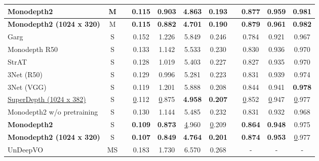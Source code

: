 \begin{table}[h]
{\begin{tabular}{lcccccccccc}
			\textbf{Monodepth2 \cite{godard2019digging}} &
			M &
			&
			\textbf{0.115} &
			\textbf{0.903} &
			\textbf{4.863} &
			\textbf{0.193} &
			\textbf{} &
			\textbf{0.877} &
			\textbf{0.959} &
			\textbf{0.981} \\ \hline
			\textbf{Monodepth2 (1024 x 320) \cite{godard2019digging}} &
			M &
			&
			\textbf{0.115} &
			\textbf{0.882} &
			\textbf{4.701} &
			\textbf{0.190} &
			\textbf{} &
			\textbf{0.879} &
			\textbf{0.961} &
			\textbf{0.982} \\ \hline
			Garg \cite{garg2016unsupervised}                      & S       &  & 0.152       & 1.226       & 5.849  & 0.246    &  & 0.784 & 0.921       & 0.967          \\
			Monodepth R50 \cite{godard2017unsupervised}             & S       &  & 0.133       & 1.142       & 5.533  & 0.230    &  & 0.830 & 0.936       & 0.970          \\
			StrAT \cite{mehta2018structured}                     & S       &  & 0.128       & 1.019       & 5.403  & 0.227    &  & 0.827 & 0.935       & 0.970          \\
			3Net (R50) \cite{poggi2018learning}                & S       &  & 0.129       & 0.996       & 5.281  & 0.223    &  & 0.831 & 0.939       & 0.974          \\
			3Net (VGG) \cite{poggi2018learning}                & S       &  & 0.119       & 1.201       & 5.888  & 0.208    &  & 0.844 & 0.941       & \textbf{0.978} \\
			{\underline{SuperDepth (1024 x 382)} \cite{pillai2019superdepth}} &
			S &
			&
			{\ul 0.112} &
			{\ul 0.875} &
			\textbf{4.958} &
			\textbf{0.207} &
			&
			{\ul 0.852} &
			{\ul 0.947} &
			{\ul 0.977} \\
			Monodepth2 w/o pretraining \cite{godard2019digging}& S       &  & 0.130       & 1.144       & 5.485  & 0.232    &  & 0.831 & 0.932       & 0.968          \\
			\textbf{Monodepth2} \cite{godard2019digging} &
			S &
			&
			\textbf{0.109} &
			\textbf{0.873} &
			{\ul 4.960} &
			{\ul 0.209} &
			&
			\textbf{0.864} &
			\textbf{0.948} &
			0.975 \\ \hline
			\textbf{Monodepth2 (1024 x 320)} \cite{godard2019digging} &
			S &
			&
			\textbf{0.107} &
			\textbf{0.849} &
			\textbf{4.764} &
			\textbf{0.201} &
			\textbf{} &
			\textbf{0.874} &
			\textbf{0.953} &
			{\ul 0.977} \\ \hline
			UnDeepVO \cite{li2018undeepvo}                  & MS      &  & 0.183       & 1.730       & 6.570  & 0.268    &  & -     & -           & -              \\

\end{tabular}}
\end{table}
